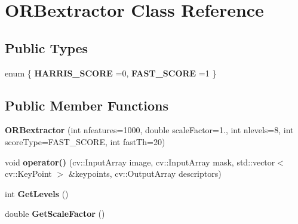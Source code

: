 \hypertarget{classORBextractor}{}\section{O\+R\+Bextractor Class Reference}
\label{classORBextractor}
\subsection*{Public Types}
\begin{DoxyCompactItemize}
\item 
enum \{ {\bfseries H\+A\+R\+R\+I\+S\+\_\+\+S\+C\+O\+RE} =0, 
{\bfseries F\+A\+S\+T\+\_\+\+S\+C\+O\+RE} =1
 \}\hypertarget{classORBextractor_a7409479401f9399a61a455724388eb7b}{}\label{classORBextractor_a7409479401f9399a61a455724388eb7b}

\end{DoxyCompactItemize}
\subsection*{Public Member Functions}
\begin{DoxyCompactItemize}
\item 
{\bfseries O\+R\+Bextractor} (int nfeatures=1000, double scale\+Factor=1., int nlevels=8, int score\+Type=F\+A\+S\+T\+\_\+\+S\+C\+O\+RE, int fast\+Th=20)\hypertarget{classORBextractor_a67f3aa9855d4b106ee1d04f9a7853b61}{}\label{classORBextractor_a67f3aa9855d4b106ee1d04f9a7853b61}

\item 
void {\bfseries operator()} (cv\+::\+Input\+Array image, cv\+::\+Input\+Array mask, std\+::vector$<$ cv\+::\+Key\+Point $>$ \&keypoints, cv\+::\+Output\+Array descriptors)\hypertarget{classORBextractor_a392a8432077d810625f5ae3080e69819}{}\label{classORBextractor_a392a8432077d810625f5ae3080e69819}

\item 
int {\bfseries Get\+Levels} ()\hypertarget{classORBextractor_ad8baed9f5385ae9c8403442eaa8967e5}{}\label{classORBextractor_ad8baed9f5385ae9c8403442eaa8967e5}

\item 
double {\bfseries Get\+Scale\+Factor} ()\hypertarget{classORBextractor_af3b9f80e41f9209dd9ff29dae3bd9d9d}{}\label{classORBextractor_af3b9f80e41f9209dd9ff29dae3bd9d9d}

\end{DoxyCompactItemize}

